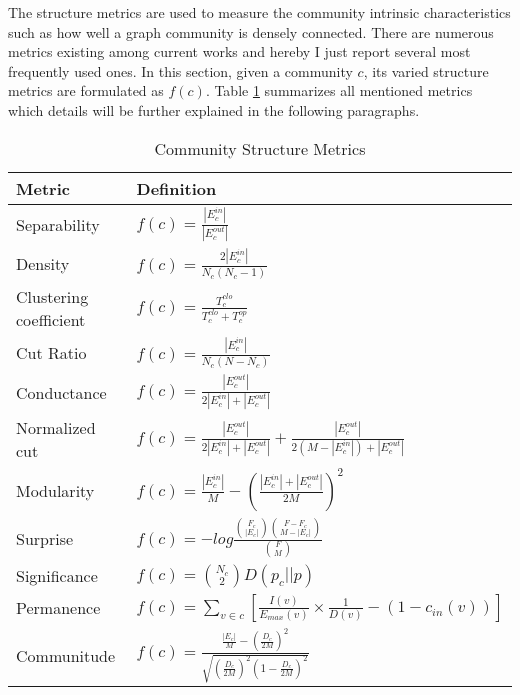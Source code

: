 The structure metrics are used to measure the community intrinsic characteristics such as how well a graph community is densely connected. There are numerous metrics existing among current works and hereby I just report several most frequently used ones. In this section, given a community $c$, its varied structure metrics are formulated as $f(c)$. Table \ref{tab:c2_structure_metric} summarizes all mentioned metrics which details will be further explained in the following paragraphs.

\begin{table}
	\centering
	\begin{tabular}{|p{5cm}|p{9cm}|} \hline
	\textbf{Metric} &  \textbf{Definition}    \\ \hline
				Separability & $f(c) = \frac{|E_{c}^{in}|}{|E_{c}^{out}|}$ \\ \hline
				Density&$f(c) = \frac{2|E_{c}^{in}|}{N_{c}(N_{c}-1)}$ \\ \hline
				Clustering coefficient & $f(c) = \frac{T_{c}^{clo}}{T_{c}^{clo} +T_{c}^{op} }$\\ \hline 
				Cut Ratio & $f(c) = \frac{|E_{c}^{in}|}{N_{c}(N-N_{c})}$ \\ \hline
				Conductance& $f(c) = \frac{|E_{c}^{out}|}{2|E_{c}^{in}|+|E_{c}^{out}|}$ \\ \hline 
				Normalized cut & $f(c) = \frac{|E_{c}^{out}|}{2|E_{c}^{in}|+|E_{c}^{out}|} + \frac{|E_{c}^{out}|}{2(M-|E_{c}^{in}|)+|E_{c}^{out}|}$\\ \hline
				Modularity& $f(c) = \frac{|E_{c}^{in}|}{M}-\left(\frac{|E_{c}^{in}|+|E_{c}^{out}|}{2M}\right)^2$\\ \hline
				Surprise& $f(c) = -log\frac{\binom{F_c}{|E_c|}\binom{F-F_c}{M-|E_c|}}{\binom{F}{M}}$ \\ \hline 
				Significance & $f(c) =  \binom{N_c}{2}D(p_c|| p)$\\ \hline
				Permanence & $f(c) = \sum_{v \in c}\left[ \frac{I(v)}{E_{max}(v) } \times \frac{1}{D(v)}- (1-c_{in}(v))\right]$ \\ \hline
				Communitude & $f(c) = \frac{\frac{|E_c|}{M} - \left(\frac{D_c}{2M}\right)^2}{\sqrt{\left(\frac{D_c}{2M}\right)^2\left(1-\frac{D_c}{2M}\right)^2}}$\\ \hline 
	\end{tabular}
	\caption{Community Structure Metrics}
	\label{tab:c2_structure_metric}
	
\end{table} 


